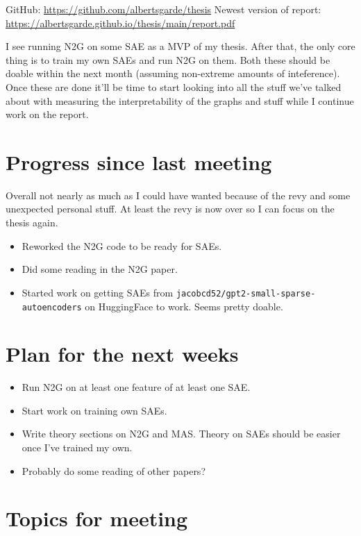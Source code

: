 \documentclass[main.tex]{subfiles}
\begin{document}
GitHub: \url{https://github.com/albertsgarde/thesis}
Newest version of report: \url{https://albertsgarde.github.io/thesis/main/report.pdf}

I see running N2G on some SAE as a MVP of my thesis.
After that, the only core thing is to train my own SAEs and run N2G on them.
Both these should be doable within the next month (assuming non-extreme amounts of inteference).
Once these are done it'll be time to start looking into all the stuff we've talked about with measuring the interpretability of the graphs and stuff while I continue work on the report.

\section*{Progress since last meeting}
Overall not nearly as much as I could have wanted because of the revy and some unexpected personal stuff.
At least the revy is now over so I can focus on the thesis again.
\begin{itemize}
    \item Reworked the N2G code to be ready for SAEs.
    \item Did some reading in the N2G paper.
    \item Started work on getting SAEs from \verb|jacobcd52/gpt2-small-sparse-autoencoders| on HuggingFace to work.
    Seems pretty doable.
\end{itemize}
\section*{Plan for the next weeks}
\begin{itemize}
    \item Run N2G on at least one feature of at least one SAE.
    \item Start work on training own SAEs.
    \item Write theory sections on N2G and MAS.
    Theory on SAEs should be easier once I've trained my own.
    \item Probably do some reading of other papers?
\end{itemize}
\section*{Topics for meeting}
\end{document}
